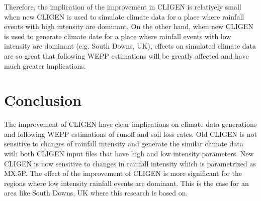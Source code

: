 Therefore, the implication of the improvement in CLIGEN is relatively small when
new CLIGEN is used to simulate climate data for a place where rainfall events
with high intensity are dominant. On the other hand, when new CLIGEN is used to
generate climate date for a place where rainfall events with low intensity are
dominant (e.g. South Downs, UK), effects on simulated climate data are so great
that following WEPP estimations will be greatly affected and have much greater
implications.


\section{Conclusion}
\label{sec:ImprovedCLIGENConclusion}
The improvement of CLIGEN have clear implications on climate data generations
and following WEPP estimations of runoff and soil loss rates. Old CLIGEN is not
sensitive to changes of rainfall intensity and generate the similar climate data
with both CLIGEN input files that have high and low intensity parameters. New
CLIGEN is now sensitive to changes in rainfall intensity which is parametrized
as {MX.5P}. The effect of the improvement of CLIGEN is more significant for the
regions where low intensity rainfall events are dominant. This is the case for
an area like South Downs, UK where this research is based on.



